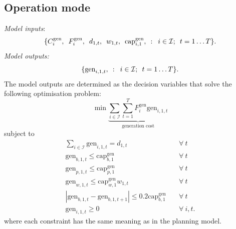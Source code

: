 \documentclass[preprint]{elsarticle}
\begin{document}
\subsection{Operation mode}
\label{sec:appendix:optimisation:model_2}
\noindent \textit{Model inputs}:
\begin{equation}
  \{C_{i}^\text{gen}, \hspace{0.5em} F_{i}^\text{gen}, \hspace{0.5em} d_{1, t}, \hspace{0.5em} w_{1, t}, \hspace{0.5em} \text{cap}_{i,1}^\text{gen}, \hspace{0.5em} : \hspace{0.5em} i \in \mathcal{I}; \hspace{0.5em} t = 1 \ldots T\}.
\label{eq:model_2:inputs}
\end{equation}
\textit{Model outputs:}
\begin{equation}
\{ \text{gen}_{i,1,t}, \hspace{0.5em} : \hspace{0.5em} i \in \mathcal{I}; \hspace{0.5em} t = 1 \ldots T\}.
\label{eq:model_2:decision_variables}
\end{equation}
The model outputs are determined as the decision variables that solve the following optimisation problem:
\begin{equation}
\min \underbrace{ \sum_{i \in \mathcal{I}} \sum_{t=1}^{T} F_i^\text{gen} \text{gen}_{i,1,t}}_\text{generation cost}
\label{eq:model_2:objective}
\end{equation}
\noindent subject to
\begin{align}
\sum_{i \in \mathcal{I}} \text{gen}_{i,1,t} = d_{1,t} \quad & \forall \: t \label{eq:model_2:demand_met} \\
\text{gen}_{b,1,t} \le \text{cap}_{b,1}^\text{gen} \quad & \forall \: t \label{eq:model_2:gen_le_cap_b} \\
\text{gen}_{p,1,t} \le \text{cap}_{p,1}^\text{gen} \quad & \forall \: t \label{eq:model_2:gen_le_cap_p} \\
\text{gen}_{w,1,t} \le \text{cap}_{w,1}^\text{gen} w_{1,t} \quad & \forall \: t \label{eq:model_2:gen_le_cap_w} \\
|\text{gen}_{b,1,t} - \text{gen}_{b,1,t+1}| \le 0.2 \text{cap}_{b,1}^\text{gen} \quad & \forall \: t \label{eq:model_2:ramping} \\
\text{gen}_{i,1,t} \ge 0 \quad & \forall \: i, t. \label{eq:model_2:ge_0}
\end{align}
\noindent where each constraint has the same meaning as in the planning model.
\end{document}
